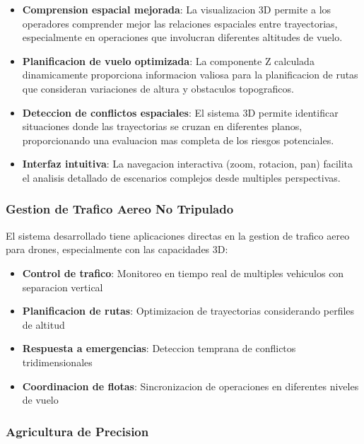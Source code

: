 \documentclass[12pt,a4paper]{article}
\begin{document}
\begin{itemize}
    \item \textbf{Comprension espacial mejorada}: La visualizacion 3D permite a los operadores comprender mejor las relaciones espaciales entre trayectorias, especialmente en operaciones que involucran diferentes altitudes de vuelo.
    
    \item \textbf{Planificacion de vuelo optimizada}: La componente Z calculada dinamicamente proporciona informacion valiosa para la planificacion de rutas que consideran variaciones de altura y obstaculos topograficos.
    
    \item \textbf{Deteccion de conflictos espaciales}: El sistema 3D permite identificar situaciones donde las trayectorias se cruzan en diferentes planos, proporcionando una evaluacion mas completa de los riesgos potenciales.
    
    \item \textbf{Interfaz intuitiva}: La navegacion interactiva (zoom, rotacion, pan) facilita el analisis detallado de escenarios complejos desde multiples perspectivas.
\end{itemize}

\subsubsection{Gestion de Trafico Aereo No Tripulado}

El sistema desarrollado tiene aplicaciones directas en la gestion de trafico aereo para drones, especialmente con las capacidades 3D:

\begin{itemize}
    \item \textbf{Control de trafico}: Monitoreo en tiempo real de multiples vehiculos con separacion vertical
    \item \textbf{Planificacion de rutas}: Optimizacion de trayectorias considerando perfiles de altitud
    \item \textbf{Respuesta a emergencias}: Deteccion temprana de conflictos tridimensionales
    \item \textbf{Coordinacion de flotas}: Sincronizacion de operaciones en diferentes niveles de vuelo
\end{itemize}

\subsubsection{Agricultura de Precision}
\end{document}
